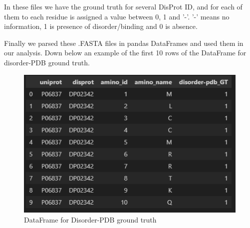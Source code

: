 In these files we have the ground truth for several DisProt ID, and for each of them to each residue is assigned a value between 0, 1 and '-'. '-' means no information, 1 is presence of disorder/binding and 0 is absence.

Finally we parsed these .FASTA files in pandas DataFrames and used them in our analysis. Down below an example of the first 10 rows of the DataFrame for disorder-PDB ground truth.

\begin{figure}
    \centering
    \includegraphics{res/analysis/disorderpdb.png}
    \caption{DataFrame for Disorder-PDB ground truth}
\end{figure}